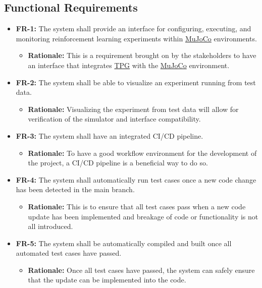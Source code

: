 \documentclass[12pt]{article}
\newcommand{\lips}{\textit{Insert your content here.}}
\begin{document}
\subsection{Functional Requirements}
\begin{itemize}
\item \label{FR-1} \textbf{FR-1:} The system shall provide an interface for configuring, executing, and monitoring reinforcement learning experiments within \hyperref[def:mujoco]{MuJoCo} environments.
  \begin{itemize}
    \item \textbf{Rationale:} This is a requirement brought on by the stakeholders to have an interface that integrates \hyperref[def:tpg]{TPG} with the \hyperref[def:mujoco]{MuJoCo} environment.
  \end{itemize}
\item \label{FR-2} \textbf{FR-2:} The system shall be able to visualize an experiment running from test data.
  \begin{itemize}
    \item \textbf{Rationale:} Visualizing the experiment from test data will allow for verification of the simulator and interface compatibility.
  \end{itemize}
\item \label{FR-3} \textbf{FR-3:} The system shall have an integrated CI/CD pipeline.
  \begin{itemize}
    \item \textbf{Rationale:} To have a good workflow environment for the development of the project, a CI/CD pipeline is a beneficial way to do so.
  \end{itemize}
\item \label{FR-4} \textbf{FR-4:} The system shall automatically run test cases once a new code change has been detected in the main branch.
  \begin{itemize}
    \item \textbf{Rationale:} This is to ensure that all test cases pass when a new code update has been implemented and breakage of code or functionality is not all introduced.
  \end{itemize}
\item \label{FR-5} \textbf{FR-5:} The system shall be automatically compiled and built once all automated test cases have passed.
  \begin{itemize}
    \item \textbf{Rationale:} Once all test cases have passed, the system can safely ensure that the update can be implemented into the code.

\end{itemize}
\end{itemize}
\end{document}
